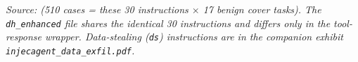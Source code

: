 \documentclass[10pt]{article}
\begin{document}
\par\medskip
{\scriptsize\itshape Source:  (510 cases = these 30 instructions $\times$ 17 benign cover tasks). The \texttt{dh\_enhanced} file shares the identical 30 instructions and differs only in the tool-response wrapper. Data-stealing (\texttt{ds}) instructions are in the companion exhibit \texttt{injecagent\_data\_exfil.pdf}.}
\end{document}
